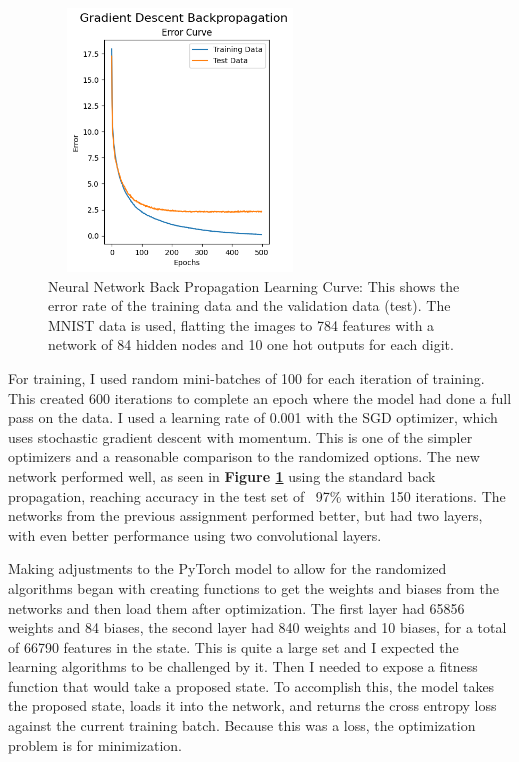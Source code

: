 \documentclass[letterpaper]{article} %
\begin{document}
\begin{figure}[!htb]
\centering
\includegraphics[width=2.75in, height=2.75in]{figures/Gradient_Descent_Backpropagation__epoch_count_500_Error_Curve.png}
\caption{Neural Network Back Propagation Learning Curve: This shows the error rate of the training data and the validation data (test).  The MNIST data is used, flatting the images to 784 features with a network of 84 hidden nodes and 10 one hot outputs for each digit.  }
\label{fig:nn_gradient_initial}
\end{figure}

For training, I used random mini-batches of 100 for each iteration of training.  This created 600 iterations to complete an epoch where the model had done a full pass on the data.  I used a learning rate of 0.001 with the SGD optimizer, which uses stochastic gradient descent with momentum.  This is one of the simpler optimizers and a reasonable comparison to the randomized options. The new network performed well, as seen in  \textbf{Figure \ref{fig:nn_gradient_initial}}  using the standard back propagation, reaching accuracy in the test set of ~97\% within 150 iterations.   The networks from the previous assignment performed better, but had two layers, with even better performance using two convolutional layers. 

Making adjustments to the PyTorch model to allow for the randomized algorithms began with creating functions to get the weights and biases from the networks and then load them after optimization.  The first layer had 65856 weights and 84 biases, the second layer had 840 weights and 10 biases, for a total of 66790 features in the state.  This is quite a large set and I expected the learning algorithms to be challenged by it.  Then I needed to expose a fitness function that would take a proposed state.  To accomplish this, the model takes the proposed state, loads it into the network, and returns the cross entropy loss against the current training batch.   Because this was a loss, the optimization problem is for minimization.
\end{document}

